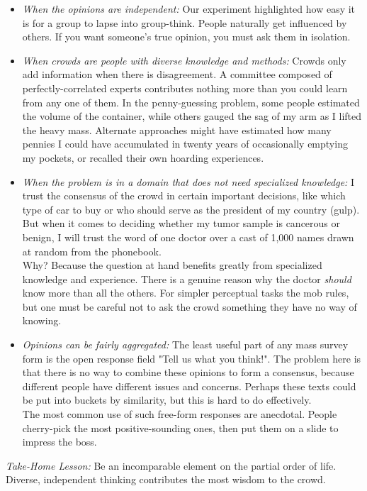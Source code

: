 \documentclass[10pt]{article}
\begin{document}
\begin{itemize}
    \item \textit{When the opinions are independent:} Our experiment highlighted how easy it is for a group to lapse into group-think. People naturally get influenced by others. If you want someone's true opinion, you must ask them in isolation.
    \item \textit{When crowds are people with diverse knowledge and methods:} Crowds only add information when there is disagreement. A committee composed of perfectly-correlated experts contributes nothing more than you could learn from any one of them. In the penny-guessing problem, some people estimated the volume of the container, while others gauged the sag of my arm as I lifted the heavy mass. Alternate approaches might have estimated how many pennies I could have accumulated in twenty years of occasionally emptying my pockets, or recalled their own hoarding experiences.
    \item \textit{When the problem is in a domain that does not need specialized knowledge:} I trust the consensus of the crowd in certain important decisions, like which type of car to buy or who should serve as the president of my country (gulp). But when it comes to deciding whether my tumor sample is cancerous or benign, I will trust the word of one doctor over a cast of 1,000 names drawn at random from the phonebook.\\
    Why? Because the question at hand benefits greatly from specialized knowledge and experience. There is a genuine reason why the doctor \textit{should} know more than all the others. For simpler perceptual tasks the mob rules, but one must be careful not to ask the crowd something they have no way of knowing.
    \item \textit{Opinions can be fairly aggregated:} The least useful part of any mass survey form is the open response field "Tell us what you think!". The problem here is that there is no way to combine these opinions to form a consensus, because different people have different issues and concerns. Perhaps these texts could be put into buckets by similarity, but this is hard to do effectively.\\
    The most common use of such free-form responses are anecdotal. People cherry-pick the most positive-sounding ones, then put them on a slide to impress the boss.
\end{itemize}

\textit{Take-Home Lesson:} Be an incomparable element on the partial order of life. Diverse, independent thinking contributes the most wisdom to the crowd.
\end{document}
